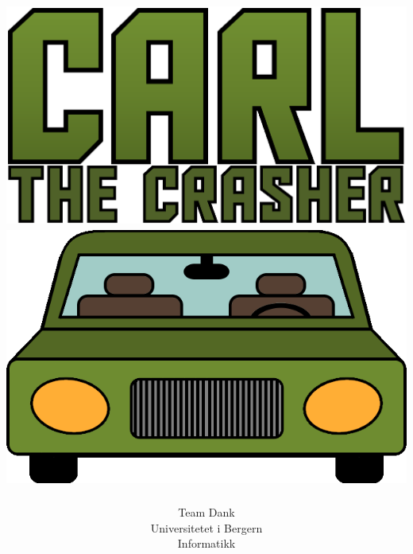 \documentclass[paper=a4]{article}
\begin{document}
\title{ \normalsize \includegraphics[scale=0.43]{images/CarGameLogo.png}
	\\
	\includegraphics[scale=0.5]{images/menu_car.png}
}
\author{Team Dank \\
Universitetet i Bergern \\
Informatikk}
\maketitle
\newpage
\end{document}
